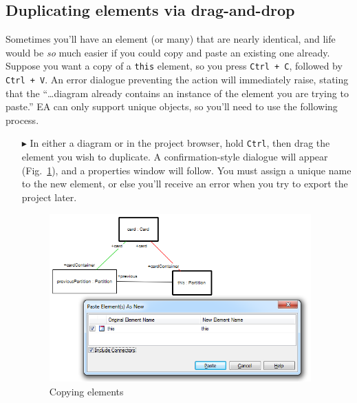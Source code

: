 \newpage

\subsection{Duplicating elements via drag-and-drop}

Sometimes you'll have an element (or many) that are nearly identical, and life would be \emph{so} much easier if you could copy and paste an existing one
already. Suppose you want a copy of a \texttt{this} element, so you press \texttt{Ctrl + C}, followed by \texttt{Ctrl + V}. An error dialogue preventing the
action will immediately raise, stating that the ``\ldots diagram already contains an instance of the element you are trying to paste.'' EA can only support
unique objects, so you'll need to use the following process.

\begin{itemize}

\item[$\blacktriangleright$] In either a diagram or in the project browser, hold \texttt{Ctrl}, then drag the element you wish to duplicate. A
confirmation-style dialogue will appear (Fig.~\ref{ea:dupWindow}), and a properties window will follow. You must assign a unique name to the new element, or
else you'll receive an error when you try to export the project later.

\vspace{0.5cm}

\begin{figure}[htbp]
\begin{center}
  \includegraphics[width=0.95\textwidth]{ea_duplicatingElements}
  \caption{Copying elements}  
  \label{ea:dupWindow}
\end{center}
\end{figure}

\end{itemize}
